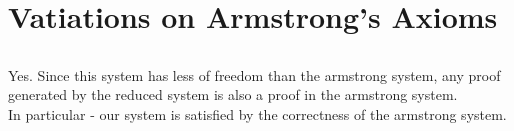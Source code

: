 \section{Vatiations on Armstrong's Axioms}
\subsection{}
Yes. Since this system has less of freedom than the armstrong system,
any proof generated by the reduced system is also a proof in the armstrong system.\\
In particular - our system is satisfied by the correctness of the armstrong system.